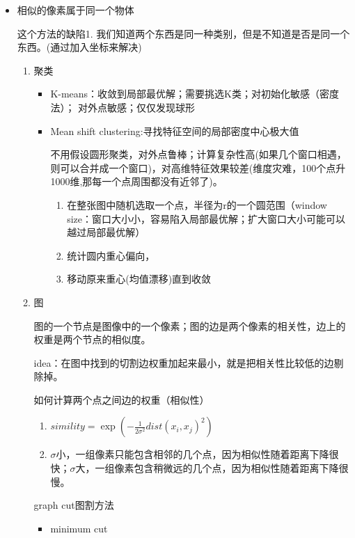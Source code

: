 \documentclass[UTF8]{ctexart}
\begin{document}
\begin{itemize}
    \item 相似的像素属于同一个物体
    
    这个方法的缺陷1. 我们知道两个东西是同一种类别，但是不知道是否是同一个东西。(通过加入坐标来解决)
    \begin{enumerate}
        \item 聚类
        \begin{itemize}
            \item K-means：收敛到局部最优解；需要挑选K类；对初始化敏感（密度法）； 对外点敏感；仅仅发现球形
            \item Mean shift clustering:寻找特征空间的局部密度中心极大值
            
            不用假设圆形聚类，对外点鲁棒；计算复杂性高(如果几个窗口相遇，则可以合并成一个窗口)，对高维特征效果较差(维度灾难，100个点升1000维,那每一个点周围都没有近邻了)。
            \begin{enumerate}
                \item 在整张图中随机选取一个点，半径为r的一个圆范围（window size：窗口大小小，容易陷入局部最优解；扩大窗口大小可能可以越过局部最优解）
                \item 统计圆内重心偏向，
                \item 移动原来重心(均值漂移)直到收敛
            \end{enumerate}
        \end{itemize}
        \item 图
        
        图的一个节点是图像中的一个像素；图的边是两个像素的相关性，边上的权重是两个节点的相似度。

        idea：在图中找到的切割边权重加起来最小，就是把相关性比较低的边剔除掉。

        如何计算两个点之间边的权重（相似性）
        \begin{enumerate}
            \item $simility=\exp(-\frac{1}{2\sigma^2}dist(x_i,x_j)^2)$
            \item $\sigma$小，一组像素只能包含相邻的几个点，因为相似性随着距离下降很快；$\sigma$大，一组像素包含稍微远的几个点，因为相似性随着距离下降很慢。
        \end{enumerate}

        graph cut图割方法

        \begin{itemize}
            \item minimum cut 
            

\end{itemize}
\end{enumerate}
\end{itemize}
\end{document}
